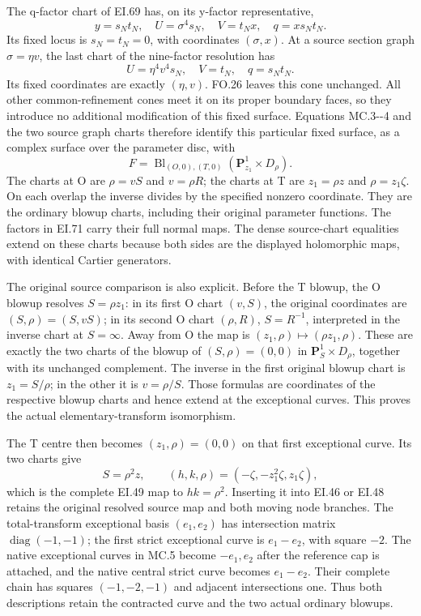 The q-factor chart of EI.69 has, on its y-factor representative,
\[
 y=s_Nt_N,\quad U=\sigma^4s_N,\quad V=t_Nx,
 \quad q=x s_Nt_N.                                    \tag{MC.3}
\]
Its fixed locus is \(s_N=t_N=0\), with coordinates \((\sigma,x)\).
At a source section graph \(\sigma=\eta v\), the last chart of
the nine-factor resolution has
\[
 U=\eta^4v^4s_N,\quad V=t_N,\quad q=s_Nt_N.             \tag{MC.4}
\]
Its fixed coordinates are exactly \((\eta,v)\). FO.26 leaves
this cone unchanged. All other common-refinement cones meet it
on its proper boundary faces, so they introduce no additional
modification of this fixed surface. Equations MC.3-\/-4 and the
two source graph charts therefore identify this particular
fixed surface, as a complex surface over the parameter disc, with
\[
 F=\operatorname{Bl}_{(O,0),(T,0)}
                  (\mathbf P^1_{z_1}\times D_\rho).     \tag{MC.5}
\]
The charts at O are \(\rho=vS\) and \(v=\rho R\); the
charts at T are \(z_1=\rho z\) and \(\rho=z_1\zeta\).
On each overlap the inverse divides by the specified nonzero
coordinate. They are the ordinary blowup charts, including
their original parameter functions. The factors in EI.71
carry their full normal maps. The dense source-chart equalities
extend on these charts because both sides are the displayed
holomorphic maps, with identical Cartier generators.

The original source comparison is also explicit. Before the
T blowup, the O blowup resolves \(S=\rho z_1\): in its first
O chart \((v,S)\), the original coordinates are
\((S,\rho)=(S,vS)\); in its second O chart \((\rho,R)\),
\(S=R^{-1}\), interpreted in the inverse chart at \(S=\infty\).
Away from O the map is \((z_1,\rho)\mapsto(\rho z_1,\rho)\).
These are exactly the two charts of the blowup of
\((S,\rho)=(0,0)\) in \(\mathbf P^1_S\times D_\rho\),
together with its unchanged complement. The inverse in the
first original blowup chart is \(z_1=S/\rho\); in the other
it is \(v=\rho/S\). Those formulas are coordinates of the
respective blowup charts and hence extend at the exceptional
curves. This proves the actual elementary-transform isomorphism.

The T centre then becomes \((z_1,\rho)=(0,0)\) on that first
exceptional curve. Its two charts give
\[
 S=\rho^2z,
 \qquad (h,k,\rho)=(-\zeta,-z_1^2\zeta,z_1\zeta),       \tag{MC.6}
\]
which is the complete EI.49 map to \(hk=\rho^2\). Inserting
it into EI.46 or EI.48 retains the original resolved source
map and both moving node branches. The total-transform
exceptional basis \((e_1,e_2)\) has intersection matrix
\(\operatorname{diag}(-1,-1)\); the first strict exceptional
curve is \(e_1-e_2\), with square \(-2\). The native exceptional
curves in MC.5 become \(-e_1,e_2\) after the reference cap is
attached, and the native central strict curve becomes
\(e_1-e_2\). Their complete chain has squares
\((-1,-2,-1)\) and adjacent intersections one. Thus both
descriptions retain the contracted curve and the two actual
ordinary blowups.

